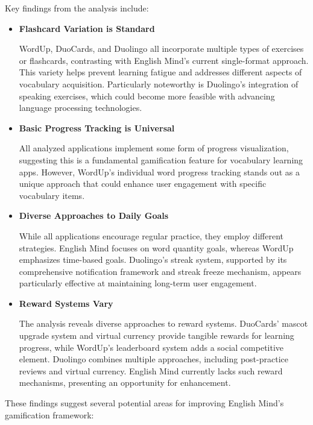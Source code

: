 Key findings from the analysis include:

\begin{itemize}
    \item \textbf{Flashcard Variation is Standard}
    
    WordUp, DuoCards, and Duolingo all incorporate multiple types of exercises or flashcards, contrasting with English Mind's current single-format approach. This variety helps prevent learning fatigue and addresses different aspects of vocabulary acquisition. Particularly noteworthy is Duolingo's integration of speaking exercises, which could become more feasible with advancing language processing technologies.

    \item \textbf{Basic Progress Tracking is Universal}
    
    All analyzed applications implement some form of progress visualization, suggesting this is a fundamental gamification feature for vocabulary learning apps. However, WordUp's individual word progress tracking stands out as a unique approach that could enhance user engagement with specific vocabulary items.

    \item \textbf{Diverse Approaches to Daily Goals}
    
    While all applications encourage regular practice, they employ different strategies. English Mind focuses on word quantity goals, whereas WordUp emphasizes time-based goals. Duolingo's streak system, supported by its comprehensive notification framework and streak freeze mechanism, appears particularly effective at maintaining long-term user engagement.

    \item \textbf{Reward Systems Vary}
    
    The analysis reveals diverse approaches to reward systems. DuoCards' mascot upgrade system and virtual currency provide tangible rewards for learning progress, while WordUp's leaderboard system adds a social competitive element. Duolingo combines multiple approaches, including post-practice reviews and virtual currency. English Mind currently lacks such reward mechanisms, presenting an opportunity for enhancement.

\end{itemize}

These findings suggest several potential areas for improving English Mind's gamification framework:

